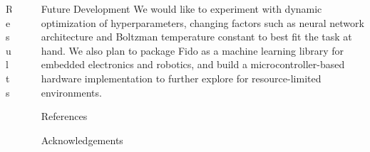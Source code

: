 \documentclass[final]{beamer}
\newlength{\sepwid}
\newlength{\onecolwid}
\newlength{\twocolwid}
\begin{document}
\begin{frame}[t]
\begin{columns}[t]
\begin{column}{\twocolwid}
\begin{block}{Results}
	\end{block}

\end{column}

\begin{column}{\sepwid}\end{column}

\begin{column}{\onecolwid}

	\begin{block}{Future Development}
		We would like to experiment with dynamic optimization of hyperparameters, changing factors such as neural network architecture and Boltzman temperature constant to best fit the task at hand.  We also plan to package Fido as a machine learning library for embedded electronics and robotics, and build a microcontroller-based hardware implementation to further explore for resource-limited environments.
	\end{block}

	\begin{block}{References}
		\nocite{*}
		\small{\vspace{0.75in}}
	\end{block}

	\begin{block}{Acknowledgements}
		\small{}
	\end{block}

\end{column}

\end{columns}
\end{frame}
\end{document}
